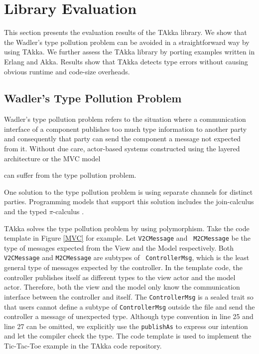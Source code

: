 


\section{Library Evaluation}

This section presents the evaluation results of the TAkka library.  
We show that the Wadler's type pollution problem can be avoided 
in a straightforward way by using TAkka. We further assess the TAkka library by 
porting examples written in Erlang and Akka.  Results show that TAkka 
detects type errors without causing obvious runtime and code-size overheads.



\subsection{Wadler\rq{}s Type Pollution Problem}
\label{type_pollution}

Wadler\rq{}s type pollution problem refers to the situation where a
communication interface of a component publishes too much type information to 
another party and consequently that party can send the component a message not
expected from it.  Without due care, actor-based systems constructed using the
layered architecture or the MVC model  
can suffer from the type pollution problem.

One solution to the type pollution problem is using separate channels for
distinct parties.  Programming models that support this solution includes the
join-calculus \citep{full_join} and the typed $\pi$-calculus \citep{pi_book}.

TAkka solves the type pollution problem by using polymorphism.  Take the
code template in Figure \ref{MVC} for example. Let {\tt V2CMessage} and {\tt 
M2CMessage} be the type of messages expected from the View and the Model
respectively.  Both {\tt V2CMessage} and {\tt M2CMessage} are subtypes of {\tt
ControllerMsg}, which is the least general type of messages expected by the 
controller. In the template code, the controller publishes itself as different 
types to the view actor and the model actor.  Therefore, both the view and the
model only know the communication interface between the controller and itself.
The {\tt ControllerMsg} is a sealed trait so that users cannot define a 
subtype of 
{\tt ControllerMsg} outside the file and send the controller a message of 
unexpected type.  Although type convention in line 25 and line 27 can be 
omitted, we explicitly use the {\tt publishAs} to express our intention and 
let the compiler check the type.  The code template is used to implement the 
Tic-Tac-Toe example in the TAkka code repository.

